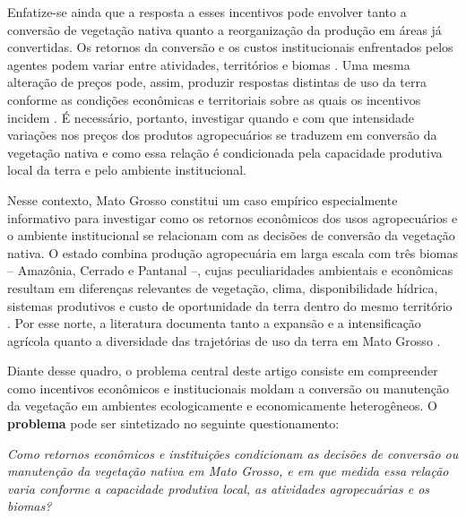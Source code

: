 Enfatize-se ainda que a resposta a esses incentivos pode envolver tanto a conversão de vegetação nativa quanto a reorganização da produção em áreas já convertidas. Os retornos da conversão e os custos institucionais enfrentados pelos agentes podem variar entre atividades, territórios e biomas \cite{ViallonEtAl2019}. Uma mesma alteração de preços pode, assim, produzir respostas distintas de uso da terra conforme as condições econômicas e territoriais sobre as quais os incentivos incidem \cite{ChomitzThomas2003}. É necessário, portanto, investigar quando e com que intensidade variações nos preços dos produtos agropecuários se traduzem em conversão da vegetação nativa e como essa relação é condicionada pela capacidade produtiva local da terra e pelo ambiente institucional.

Nesse contexto, Mato Grosso constitui um caso empírico especialmente informativo para investigar como os retornos econômicos dos usos agropecuários e o ambiente institucional se relacionam com as decisões de conversão da vegetação nativa. O estado combina produção agropecuária em larga escala com três biomas -- Amazônia, Cerrado e Pantanal --, cujas peculiaridades ambientais e econômicas resultam em diferenças relevantes de vegetação, clima, disponibilidade hídrica, sistemas produtivos e custo de oportunidade da terra dentro do mesmo território \cite{VanWeyEtAl2013}. Por esse norte, a literatura documenta tanto a expansão e a intensificação agrícola quanto a diversidade das trajetórias de uso da terra em Mato Grosso \cite{SimoesEtAl2020}.


Diante desse quadro, o problema central deste artigo consiste em compreender como incentivos econômicos e institucionais moldam a conversão ou manutenção da vegetação em ambientes ecologicamente e economicamente heterogêneos. O \textbf{problema} pode ser sintetizado no seguinte questionamento:

\medskip
\noindent\emph{Como retornos econômicos e instituições condicionam as decisões de conversão ou manutenção da vegetação nativa em Mato Grosso, e em que medida essa relação varia conforme a capacidade produtiva local, as atividades agropecuárias e os biomas?}
\medskip

